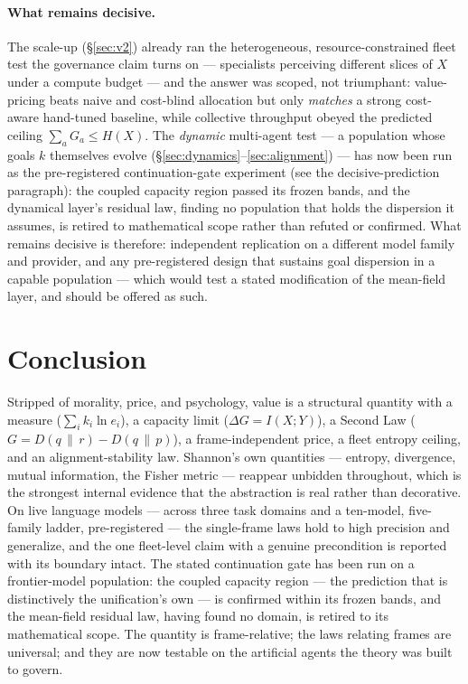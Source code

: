 \documentclass[11pt]{article}
\theoremstyle{plain}
\theoremstyle{definition}
\theoremstyle{remark}
\newcommand{\KL}[2]{D\!\left(#1\,\|\,#2\right)}
\newcommand{\I}{I}
\begin{document}
\paragraph{What remains decisive.} The scale-up (\S\ref{sec:v2}) already ran the heterogeneous,
resource-constrained fleet test the governance claim turns on --- specialists perceiving different slices of $X$
under a compute budget --- and the answer was scoped, not triumphant: value-pricing beats naive and cost-blind
allocation but only \emph{matches} a strong cost-aware hand-tuned baseline, while collective throughput obeyed
the predicted ceiling $\sum_a G_a\le H(X)$. The \emph{dynamic} multi-agent test --- a population whose goals $k$
themselves evolve (\S\ref{sec:dynamics}--\ref{sec:alignment}) --- has now been run as the pre-registered
continuation-gate experiment (see the decisive-prediction paragraph): the coupled capacity region passed its
frozen bands, and the dynamical layer's residual law, finding no population that holds the dispersion it
assumes, is retired to mathematical scope rather than refuted or confirmed. What remains decisive is therefore:
independent replication on a different model family and provider, and any pre-registered design that sustains
goal dispersion in a capable population --- which would test a stated modification of the mean-field layer, and
should be offered as such.

\section{Conclusion}\label{sec:conclusion}

Stripped of morality, price, and psychology, value is a structural quantity with a measure ($\sum_i k_i\ln e_i$),
a capacity limit ($\Delta G=\I(X;Y)$), a Second Law ($G=\KL{q}{r}-\KL{q}{p}$), a frame-independent price, a
fleet entropy ceiling, and an alignment-stability law. Shannon's own quantities --- entropy, divergence, mutual
information, the Fisher metric --- reappear unbidden throughout, which is the strongest internal evidence that
the abstraction is real rather than decorative. On live language models --- across three task domains and a
ten-model, five-family ladder, pre-registered --- the single-frame laws hold to high precision and generalize,
and the one fleet-level claim with a genuine precondition is reported with its boundary intact. The stated
continuation gate has been run on a frontier-model population: the coupled capacity region --- the prediction
that is distinctively the unification's own --- is confirmed within its frozen bands, and the mean-field
residual law, having found no domain, is retired to its mathematical scope. The
quantity is frame-relative; the laws relating frames are universal; and they are now testable on the artificial
agents the theory was built to govern.
\end{document}
